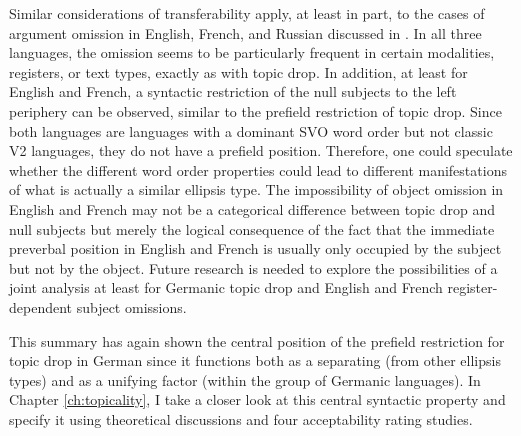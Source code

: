 Similar considerations of transferability apply, at least in part, to the cases of argument omission  in English, French, and Russian discussed in .
In all three languages, the omission seems to be particularly frequent in certain modalities, registers, or text types,  exactly as with topic drop.
In addition, at least for English and French, a syntactic restriction of the null subjects  to the left periphery can be observed, similar to the prefield restriction of topic drop.
Since both languages are languages with a dominant SVO word order but not classic V2 languages, they do not have a prefield position. 
Therefore, one could speculate whether the different word order properties could lead to different manifestations of what is actually a similar ellipsis type.
The impossibility of object omission in English and French may not be a categorical difference between topic drop and null subjects  but merely the logical consequence of the fact that the immediate preverbal position in English and French is usually only occupied by the subject but not by the object.
Future research is needed to explore the possibilities of a joint analysis at least for Germanic topic drop and English and French register-dependent subject omissions. 

This summary has again shown the central position of the prefield restriction for topic drop in German since it functions both as a separating  (from other ellipsis types) and as a unifying factor (within the group of Germanic languages).
In Chapter \ref{ch:topicality}, I take a closer look at this central syntactic property and specify it using theoretical discussions and four acceptability rating studies.
